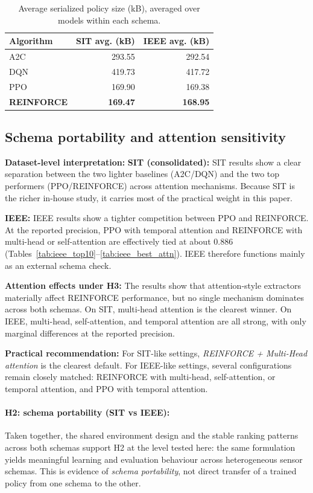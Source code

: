 \documentclass[sn-vancouver-num]{sn-jnl}%
\begin{document}
\begin{table}[htbp]
\centering
\caption{Average serialized policy size (kB), averaged over models within each schema.}
\label{tab:model_size_summary}
\begin{tabular}{l r r}
\toprule
	\textbf{Algorithm} & \textbf{SIT avg. (kB)} & \textbf{IEEE avg. (kB)}\\
	\midrule
	A2C & 293.55 & 292.54\\
	DQN & 419.73 & 417.72\\
	PPO & 169.90 & 169.38\\
	\textbf{REINFORCE} & \textbf{169.47} & \textbf{168.95}\\
\bottomrule
\end{tabular}
\end{table}

\subsection{Schema portability and attention sensitivity}
\textbf{Dataset-level interpretation:}
\textbf{SIT (consolidated):} SIT results show a clear separation between the two lighter baselines (A2C/DQN) and the two top performers (PPO/\textsc{REINFORCE}) across attention mechanisms. Because SIT is the richer in-house study, it carries most of the practical weight in this paper.

\textbf{IEEE:} IEEE results show a tighter competition between PPO and \textsc{REINFORCE}. At the reported precision, PPO with temporal attention and \textsc{REINFORCE} with multi-head or self-attention are effectively tied at about 0.886 (Tables~\ref{tab:ieee_top10}--\ref{tab:ieee_best_attn}). IEEE therefore functions mainly as an external schema check.

\textbf{Attention effects under H3:}
The results show that attention-style extractors materially affect \textsc{REINFORCE} performance, but no single mechanism dominates across both schemas. On SIT, multi-head attention is the clearest winner. On IEEE, multi-head, self-attention, and temporal attention are all strong, with only marginal differences at the reported precision.

\textbf{Practical recommendation:}
For SIT-like settings, \emph{REINFORCE + Multi-Head attention} is the clearest default. For IEEE-like settings, several configurations remain closely matched: \textsc{REINFORCE} with multi-head, self-attention, or temporal attention, and PPO with temporal attention.

\paragraph{H2: schema portability (SIT vs IEEE):}
Taken together, the shared environment design and the stable ranking patterns across both schemas support H2 at the level tested here: the same formulation yields meaningful learning and evaluation behaviour across heterogeneous sensor schemas. This is evidence of \emph{schema portability}, not direct transfer of a trained policy from one schema to the other.
\end{document}
